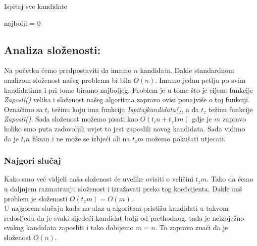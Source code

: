 \documentclass[10pt,a4paper]{article}
\begin{document}
\begin{algorithm}[H]
\caption{Ispitaj sve kandidate}
najbolji = 0\;
\end{algorithm}

\subsection*{Analiza složenosti:}
Na početku ćemo predpostaviti da imamo $n$ kandidata. Dakle standardnom analizom složenost našeg 
problema bi bila $O(n)$. Imamo jednu petlju po svim kandidatima i pri tome biramo najboljeg. 
Problem je u tome što je cijena funkcije \textit{Zaposli()} velika i složenost našeg algoritma 
zapravo ovisi ponajviše o toj funkciji.\\
Označimo sa $t_i$ težinu koju ima funkcija \textit{Ispitajkandidata()}, a da $t_z$ težinu funkcije 
\textit{Zaposli()}. Sada složenost možemo pisati kao $O(t_in + t_z1m)$ gdje je $m$ zapravo koliko 
smo puta zadovoljili uvjet to jest zaposlili novog kandidata. Sada vidimo da je $t_in$ fiksan i ne 
može se izbjeći ali na $t_zm$ možemo pokušati utjecati.
\subsubsection*{Najgori slučaj}
Kako smo već vidjeli naša složenost će uvelike ovisiti o veličini $t_zm$. 
Tako da ćemo u daljnjem razmatranju složenost i izražavati preko tog koeficijenta. Dakle naš problem 
je složenosti $O(t_zm)=O(m)$. \\
U najgorem slučaju kada na ulaz u algoritam pristižu kandidati u takvom redosljedu da je svaki sljedeći 
kandidat bolji od prethodnog, tada je neizbježno svakog kandidata zaposliti i tako dobijemo $m=n$. 
To zapravo znači da je složenost $O(n)$.
\end{document}
